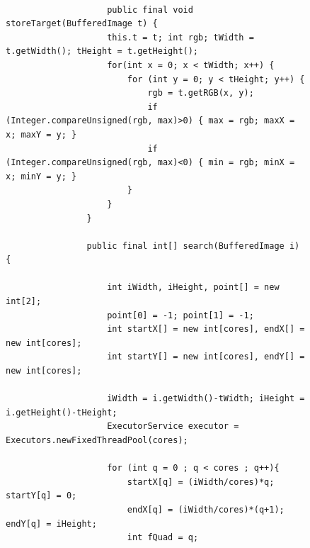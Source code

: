 \documentclass[tg]{mdtufsm}
\begin{document}
                \begin{figure}[!htb]
                \begin{lstlisting}

                    public final void storeTarget(BufferedImage t) {
                    this.t = t; int rgb; tWidth = t.getWidth(); tHeight = t.getHeight();
                    for(int x = 0; x < tWidth; x++) {
                        for (int y = 0; y < tHeight; y++) {
                            rgb = t.getRGB(x, y);
                            if (Integer.compareUnsigned(rgb, max)>0) { max = rgb; maxX = x; maxY = y; }
                            if (Integer.compareUnsigned(rgb, max)<0) { min = rgb; minX = x; minY = y; }
                        }
                    }
                }

                public final int[] search(BufferedImage i) {

                    int iWidth, iHeight, point[] = new int[2];
                    point[0] = -1; point[1] = -1;
                    int startX[] = new int[cores], endX[] = new int[cores];
                    int startY[] = new int[cores], endY[] = new int[cores];

                    iWidth = i.getWidth()-tWidth; iHeight = i.getHeight()-tHeight;
                    ExecutorService executor = Executors.newFixedThreadPool(cores);

                    for (int q = 0 ; q < cores ; q++){
                        startX[q] = (iWidth/cores)*q; startY[q] = 0;
                        endX[q] = (iWidth/cores)*(q+1); endY[q] = iHeight;
                        int fQuad = q;


\end{lstlisting}
\end{figure}
\end{document}
